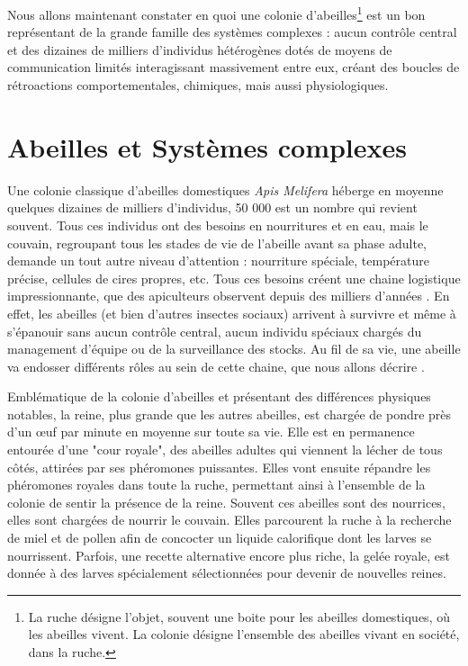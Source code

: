 			Nous allons maintenant constater en quoi une colonie d'abeilles\footnote{La ruche désigne l'objet, souvent une boite pour les abeilles domestiques, où les abeilles vivent. La colonie désigne l'ensemble des abeilles vivant en société, dans la ruche.} est un bon représentant de la grande famille des systèmes complexes : aucun contrôle central et des dizaines de milliers d'individus hétérogènes dotés de moyens de communication limités interagissant massivement entre eux, créant des boucles de rétroactions comportementales, chimiques, mais aussi physiologiques.
			
			

	
		\section{Abeilles et Systèmes complexes}	
		\label{sectionBio}	
			Une colonie classique d'abeilles domestiques \textit{Apis Melifera} héberge en moyenne quelques dizaines de milliers d'individus, 50 000 est un nombre qui revient souvent. Tous ces individus ont des besoins en nourritures et en eau, mais le couvain, regroupant tous les stades de vie de l'abeille avant sa phase adulte, demande un tout autre niveau d'attention : nourriture spéciale, température précise, cellules de cires propres, etc. Tous ces besoins créent une chaine logistique impressionnante, que des apiculteurs observent depuis des milliers d'années \cite{oldroyd_domestication_2012}. En effet, les abeilles (et bien d'autres insectes sociaux) arrivent à survivre et même à s'épanouir sans aucun contrôle central, aucun individu spéciaux chargés du management d'équipe ou de la surveillance des stocks. Au fil de sa vie, une abeille va endosser différents rôles au sein de cette chaine, que nous allons décrire \cite{winston_biology_1991, winston_role_1991, seeley_age_1991}. 
			
			Emblématique de la colonie d'abeilles et présentant des différences physiques notables, la reine, plus grande que les autres abeilles, est chargée de pondre près d'un œuf par minute en moyenne sur toute sa vie. Elle est en permanence entourée d'une "cour royale", des abeilles adultes qui viennent la lécher de tous côtés, attirées par ses phéromones puissantes. Elles vont ensuite répandre les phéromones royales dans toute la ruche, permettant ainsi à l'ensemble de la colonie de sentir la présence de la reine. Souvent ces abeilles sont des nourrices, elles sont chargées de nourrir le couvain. Elles parcourent la ruche à la recherche de miel et de pollen afin de concocter un liquide calorifique dont les larves se nourrissent. Parfois, une recette alternative encore plus riche, la gelée royale, est donnée à des larves spécialement sélectionnées pour devenir de nouvelles reines.
			
